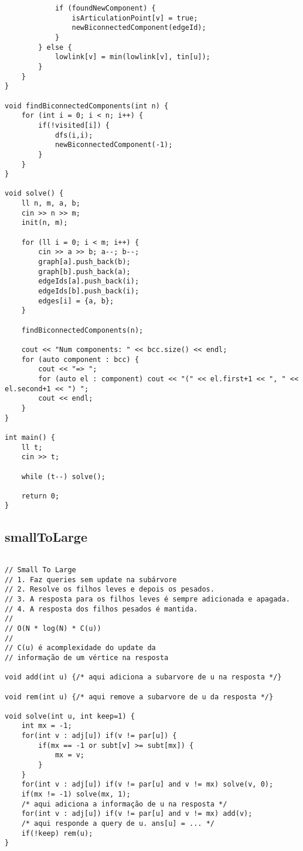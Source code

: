 \documentclass[landscape,twocolumn,10pt,a4paper]{article}
\begin{document}
\begin{verbatim}
            if (foundNewComponent) {
                isArticulationPoint[v] = true;
                newBiconnectedComponent(edgeId);
            }
        } else {
            lowlink[v] = min(lowlink[v], tin[u]);
        }
    }
}

void findBiconnectedComponents(int n) {
    for (int i = 0; i < n; i++) {
        if(!visited[i]) {
            dfs(i,i);
            newBiconnectedComponent(-1);
        }
    }
}

void solve() {
    ll n, m, a, b;
    cin >> n >> m;
    init(n, m);

    for (ll i = 0; i < m; i++) {
        cin >> a >> b; a--; b--;
        graph[a].push_back(b);
        graph[b].push_back(a);
        edgeIds[a].push_back(i);
        edgeIds[b].push_back(i);
        edges[i] = {a, b};
    }

    findBiconnectedComponents(n);

    cout << "Num components: " << bcc.size() << endl; 
    for (auto component : bcc) {
        cout << "=> ";
        for (auto el : component) cout << "(" << el.first+1 << ", " << el.second+1 << ") ";
        cout << endl;
    }       
}

int main() {
    ll t;
    cin >> t;

    while (t--) solve();

    return 0;
}\end{verbatim}

\subsection{smallToLarge}
\begin{verbatim}

// Small To Large
// 1. Faz queries sem update na subárvore
// 2. Resolve os filhos leves e depois os pesados. 
// 3. A resposta para os filhos leves é sempre adicionada e apagada. 
// 4. A resposta dos filhos pesados é mantida.
//
// O(N * log(N) * C(u))
// 
// C(u) é acomplexidade do update da
// informação de um vértice na resposta

void add(int u) {/* aqui adiciona a subarvore de u na resposta */}

void rem(int u) {/* aqui remove a subarvore de u da resposta */}
 
void solve(int u, int keep=1) {
    int mx = -1;
    for(int v : adj[u]) if(v != par[u]) {
        if(mx == -1 or subt[v] >= subt[mx]) {
            mx = v;
        }
    }
    for(int v : adj[u]) if(v != par[u] and v != mx) solve(v, 0);
    if(mx != -1) solve(mx, 1);
    /* aqui adiciona a informação de u na resposta */
    for(int v : adj[u]) if(v != par[u] and v != mx) add(v);
    /* aqui responde a query de u. ans[u] = ... */
    if(!keep) rem(u);
}\end{verbatim}
\end{document}
